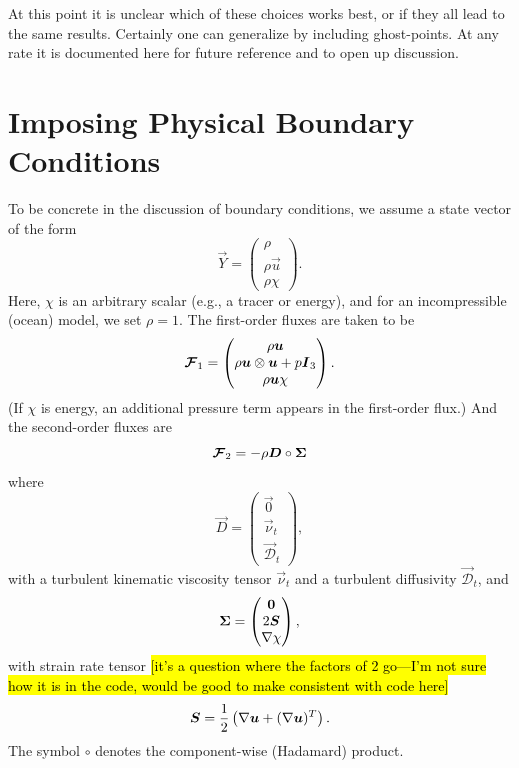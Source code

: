 \documentclass{report}
\numberwithin{equation}{section}
\begin{document}
At this point it is unclear which of these choices works best, or if they all lead to the same results. Certainly one can generalize by including ghost-points. At any rate it is documented here for future reference and to open up discussion. 

\section{Imposing Physical Boundary Conditions}

To be concrete in the discussion of boundary conditions, we assume a state vector of the form
\begin{equation}
  \vec{Y} =
  \begin{pmatrix}
    \rho\\
    \rho \vec{u}\\
    \rho \chi
  \end{pmatrix}.
\end{equation}
Here, $\chi$ is an arbitrary scalar (e.g., a tracer or energy), and for an incompressible (ocean) model, we set $\rho=1$. The first-order fluxes are taken to be
\begin{equation}
     \boldsymbol{{\mathcal{F}}}_1 =
  \begin{pmatrix}
    \rho \boldsymbol{{u}}\\
    \rho \boldsymbol{{u}} \otimes \boldsymbol{{u}} + p\boldsymbol{{I}}_3\\
    \rho \boldsymbol{{u}} \chi 
  \end{pmatrix}.
\end{equation}
(If $\chi$ is energy, an additional pressure term appears in the first-order flux.) And the second-order fluxes are
\begin{equation}
  \boldsymbol{{\mathcal{F}}}_2 = -\rho \boldsymbol{{D}} \circ \boldsymbol{{\Sigma}}
\end{equation}
where
\begin{equation}
    \vec{D} = 
    \begin{pmatrix}
    \vec{0}\\
    \vec{\nu}_t\\
    \vec{\mathcal{D}}_t
  \end{pmatrix},
\end{equation}
with a turbulent kinematic viscosity tensor $\vec{\nu}_t$ and a turbulent diffusivity $\vec{\mathcal{D}}_t$, and
\begin{equation}
  \boldsymbol{{\Sigma}} = 
  \begin{pmatrix}
    \boldsymbol{{0}}\\
    2\boldsymbol{{S}}\\
    \nabla\chi 
  \end{pmatrix},
\end{equation}
with strain rate tensor \hl{[it's a question where the factors of 2 go---I'm not sure how it is in the code, would be good to make consistent with code here]}
\begin{equation}
    \boldsymbol{{S}} = \frac{1}{2} \left( \nabla \boldsymbol{{u}} + (\nabla{\boldsymbol{{u}}})^T\right).
\end{equation}
The symbol $\circ$ denotes the component-wise (Hadamard) product.
\end{document}
